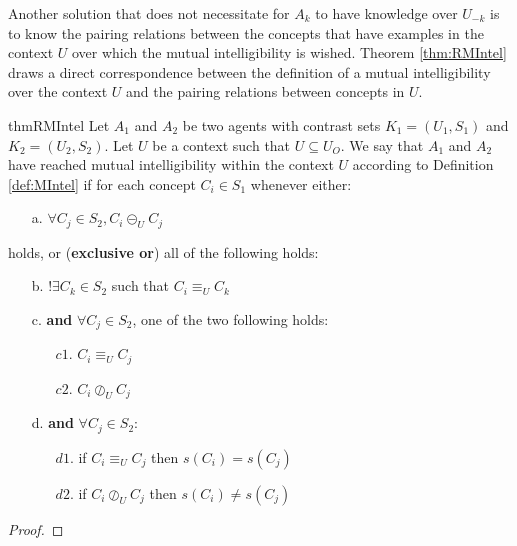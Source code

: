 Another solution that does not necessitate for $A_{k}$ to have knowledge over $U_{-k}$ is to know the pairing relations between the concepts that have examples in the context $U$ over which the mutual intelligibility is wished. Theorem \ref{thm:RMIntel} draws a direct correspondence between the definition of a mutual intelligibility over the context $U$ and the pairing relations between concepts in $U$. 

\begin{restatable}{thm}{RMIntel}
\label{thm:RMIntel}
Let $A_{1}$ and $A_{2}$ be two agents with contrast sets $K_{1} = (U_{1},S_{1})$ and $K_{2} = (U_{2},S_{2})$. Let $U$ be a context such that $U \subseteq U_{O}$. We say that $A_{1}$ and $A_{2}$ have reached mutual intelligibility within the context $U$ according to Definition \ref{def:MIntel} if for each concept $C_{i} \in S_{1}$ whenever either:

\begin{itemize}
    \item[a.] $\forall C_{j} \in S_{2}, C_{i} \circleddash_{U} C_{j}$ 
\end{itemize}

holds, or (\textbf{exclusive or}) all of the following holds:

\begin{itemize}
    \item[b.] $!\exists C_{k} \in S_{2}$ such that $C_{i} \equiv_{U} C_{k}$
    \item[c.] \textbf{and} $\forall C_{j} \in S_{2}$, one of the two following holds:
    \begin{itemize}
    \item[$c1$.] $C_{i} \equiv_{U} C_{j}$
    \item[$c2$.] $C_{i} \oslash_{U} C_{j}$
    \end{itemize}
    \item[d.] \textbf{and} $ \forall C_{j} \in S_{2}$:
    \begin{itemize}
        \item[$d1$.] if $C_{i} \equiv_{U} C_{j}$ then $s(C_{i}) = s(C_{j})$
        \item[$d2$.] if $C_{i} \oslash_{U} C_{j}$ then $s(C_{i}) \neq s(C_{j})$
    \end{itemize}
\end{itemize}

\end{restatable}

\begin{proof}

\end{proof}

